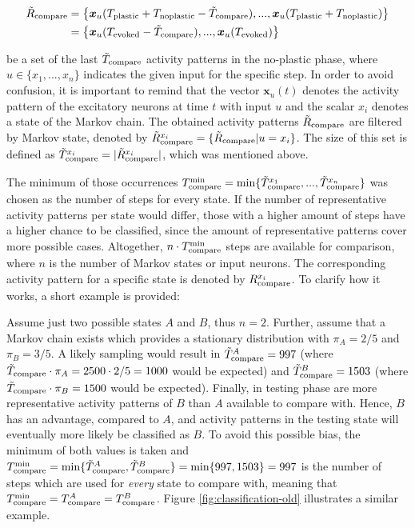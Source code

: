 \begin{equation}
\begin{split}
\tilde{R}_{\text{compare}} &= \left\{ \bm x_u(T_{\text{plastic}}+T_{\text{noplastic}}-\tilde{T}_{\text{compare}}), ..., \bm x_u(T_{\text{plastic}}+T_{\text{noplastic}}) \right\}\\
&= \left\{ \bm x_u(T_{\text{evoked}}-\tilde{T}_{\text{compare}}), ..., \bm x_u(T_{\text{evoked}}) \right\}
\end{split}
\end{equation}

be a set of the last $\tilde{T}_{\text{compare}}$ activity patterns in the no-plastic phase, where $u \in \{x_1, ..., x_n\}$ indicates the given input for the specific step. In order to avoid confusion, it is important to remind that the vector $\bm x_u(t)$ denotes the activity pattern of the excitatory neurons at time $t$ with input $u$ and the scalar $x_i$ denotes a state of the Markov chain. The obtained activity patterns $\tilde{R}_{\text{compare}}$ are filtered by Markov state, denoted by $\tilde{R}_{\text{compare}}^{x_i} = \{ \tilde{R}_{\text{compare}} | u = x_i \}$. The size of this set is defined as $\tilde{T}_{\text{compare}}^{x_i} = |\tilde{R}_{\text{compare}}^{x_i}|$, which was mentioned above.

The minimum of those occurrences $T_{\text{compare}}^{\text{min}} = \min\{\tilde{T}_{\text{compare}}^{x_1}, ..., \tilde{T}_{\text{compare}}^{x_n}\}$ was chosen as the number of steps for every state. If the number of representative activity patterns per state would differ, those with a higher amount of steps have a higher chance to be classified, since the amount of representative patterns cover more possible cases. Altogether, $n \cdot T_{\text{compare}}^{\text{min}}$ steps are available for comparison, where $n$ is the number of Markov states or input neurons. The corresponding activity pattern for a specific state is denoted by $R_{\text{compare}}^{x_i}$. To clarify how it works, a short example is provided:

Assume just two possible states $A$ and $B$, thus $n=2$. Further, assume that a Markov chain exists which provides a stationary distribution with $\pi_A = 2/5$ and $\pi_B = 3/5$. A likely sampling would result in $\tilde{T}_{\text{compare}}^A = 997$ (where $\tilde{T}_{\text{compare}} \cdot \pi_A = 2500 \cdot 2/5 = 1000$ would be expected) and $\tilde{T}_{\text{compare}}^B = 1503$ (where $\tilde{T}_{\text{compare}} \cdot \pi_B = 1500$ would be expected). Finally, in testing phase are more representative activity patterns of $B$ than $A$ available to compare with. Hence, $B$ has an advantage, compared to $A$, and activity patterns in the testing state will eventually more likely be classified as $B$. To avoid this possible bias, the minimum of both values is taken and $T_{\text{compare}}^{\text{min}} = \min\{\tilde{T}_{\text{compare}}^A, \tilde{T}_{\text{compare}}^B\} = \min\{997,1503\} = 997$ is the number of steps which are used for \emph{every} state to compare with, meaning that $T_{\text{compare}}^{\text{min}} = T_{\text{compare}}^A = T_{\text{compare}}^B$. Figure \ref{fig:classification-old} illustrates a similar example.

